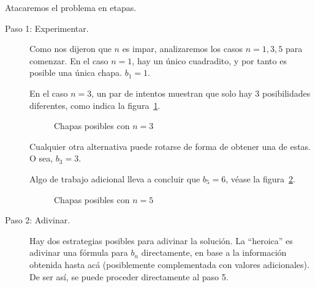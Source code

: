 
  \begin{solution}
    Atacaremos el problema en etapas.

    \begin{description}
    \item[Paso 1: Experimentar.]
      Como nos dijeron que \(n\) es impar,
      analizaremos los casos \(n = 1, 3, 5\) para comenzar.
      En el caso \(n = 1\),
      hay un único cuadradito,
      y por tanto es posible una única chapa.
      \(b_1 = 1\).

      En el caso \(n = 3\),
      un par de intentos
      muestran que solo hay \(3\) posibilidades diferentes,
      como indica la figura~\ref{fig:chapas-3}.
      \begin{figure}[htbp]
	\centering
	  \hspace*{2em}%
	  \hspace*{2em}%
	\caption{Chapas posibles con $n = 3$}
	\label{fig:chapas-3}
      \end{figure}
      Cualquier otra alternativa puede rotarse
      de forma de obtener una de estas.
      O sea,
      \(b_3 = 3\).

      Algo de trabajo adicional lleva a concluir que \(b_5 = 6\),
      véase la figura~\ref{fig:chapas-5}.
      \begin{figure}[htbp]
	\centering
	  \hspace*{1em}%
	  \hspace*{1em}%
	  \vspace*{1em}
	  \hspace*{1em}%
	  \hspace*{1em}%
	\caption{Chapas posibles con $n = 5$}
	\label{fig:chapas-5}
      \end{figure}
    \item[Paso 2: Adivinar.]
      Hay dos estrategias posibles para adivinar la solución.
      La ``heroica''
      es adivinar una fórmula para \(b_n\) directamente,
      en base a la información obtenida hasta acá
      (posiblemente complementada con valores adicionales).
      De ser así,
      se puede proceder directamente al paso 5.


\end{description}
\end{solution}
